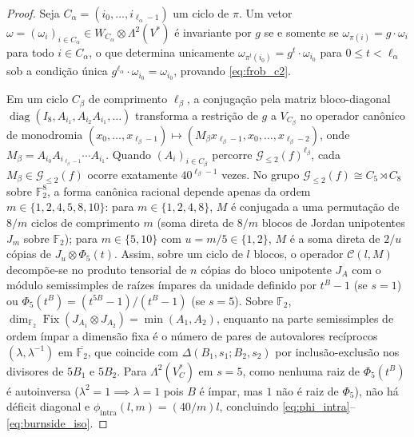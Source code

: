 \documentclass[11pt,a4paper]{article}
\theoremstyle{definition}
\theoremstyle{remark}
\newcommand{\F}{\mathbb{F}_2}
\newcommand{\Fix}{\operatorname{Fix}}
\begin{document}
\begin{proof}
Seja $C_\alpha = (i_0, \dots, i_{\ell_\alpha-1})$ um ciclo de $\pi$. Um vetor $\omega = (\omega_i)_{i \in C_\alpha} \in W_{C_\alpha} \otimes \Lambda^2(V^*)$ é invariante por $g$ se e somente se $\omega_{\pi(i)} = g \cdot \omega_i$ para todo $i \in C_\alpha$, o que determina unicamente $\omega_{\pi^t(i_0)} = g^t \cdot \omega_{i_0}$ para $0 \le t < \ell_\alpha$ sob a condição única $g^{\ell_\alpha} \cdot \omega_{i_0} = \omega_{i_0}$, provando \eqref{eq:frob_c2}.

Em um ciclo $C_\beta$ de comprimento $\ell_\beta$, a conjugação pela matriz bloco-diagonal $\operatorname{diag}(I_8, A_{i_1}, \allowbreak A_{i_2}A_{i_1}, \dots)$ transforma a restrição de $g$ a $V_{C_\beta}$ no operador canônico de monodromia $(x_0,\dots,x_{\ell_\beta-1}) \mapsto (M_\beta x_{\ell_\beta-1}, x_0, \dots, x_{\ell_\beta-2})$, onde $M_\beta = A_{i_0}A_{i_{\ell_\beta-1}}\cdots A_{i_1}$. Quando $(A_i)_{i \in C_\beta}$ percorre $\mathcal{G}_{\le 2}(f)^{\ell_\beta}$, cada $M_\beta \in \mathcal{G}_{\le 2}(f)$ ocorre exatamente $40^{\ell_\beta - 1}$ vezes. No grupo $\mathcal{G}_{\le 2}(f) \cong C_5 \rtimes C_8$ sobre $\F^8$, a forma canônica racional depende apenas da ordem $m \in \{1,2,4,5,8,10\}$: para $m \in \{1,2,4,8\}$, $M$ é conjugada a uma permutação de $8/m$ ciclos de comprimento $m$ (soma direta de $8/m$ blocos de Jordan unipotentes $J_m$ sobre $\F$); para $m \in \{5,10\}$ com $u = m/5 \in \{1,2\}$, $M$ é a soma direta de $2/u$ cópias de $J_u \otimes \Phi_5(t)$. Assim, sobre um ciclo de $l$ blocos, o operador $\mathcal{C}(l, M)$ decompõe-se no produto tensorial de $n$ cópias do bloco unipotente $J_A$ com o módulo semissimples de raízes ímpares da unidade definido por $t^B - 1$ (se $s=1$) ou $\Phi_5(t^B) = (t^{5B}-1)/(t^B-1)$ (se $s=5$). Sobre $\F$, $\dim_{\F}\Fix(J_{A_1} \otimes J_{A_2}) = \min(A_1, A_2)$, enquanto na parte semissimples de ordem ímpar a dimensão fixa é o número de pares de autovalores recíprocos $(\lambda, \lambda^{-1})$ em $\overline{\F}$, que coincide com $\Delta(B_1,s_1; B_2,s_2)$ por inclusão-exclusão nos divisores de $5B_1$ e $5B_2$. Para $\Lambda^2(V_C^*)$ em $s=5$, como nenhuma raiz de $\Phi_5(t^B)$ é autoinversa ($\lambda^2 = 1 \implies \lambda = 1$ pois $B$ é ímpar, mas $1$ não é raiz de $\Phi_5$), não há déficit diagonal e $\phi_{\mathrm{intra}}(l, m) = (40/m)l$, concluindo \eqref{eq:phi_intra}--\eqref{eq:burnside_iso}.
\end{proof}
\end{document}
